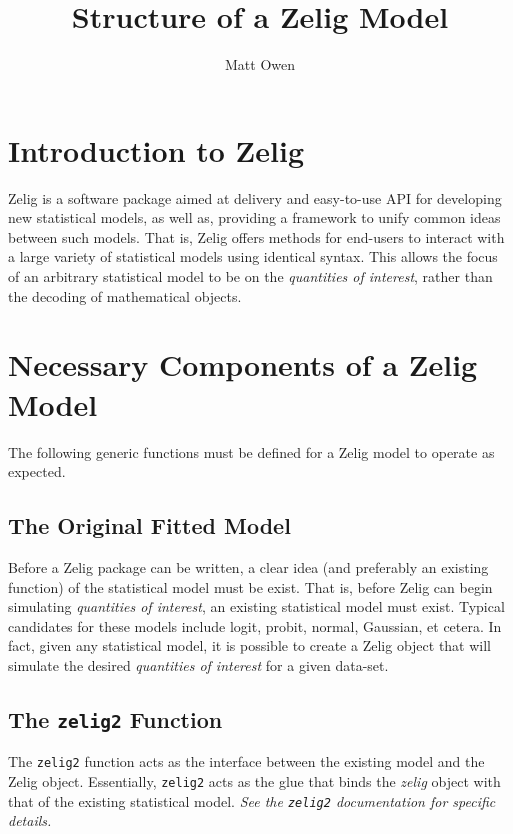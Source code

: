 \documentclass[a4paper,10pt]{article}
\begin{document}
%
\title{Structure of a Zelig Model}
\author{Matt Owen}
\maketitle


\section{Introduction to Zelig}
Zelig is a software package aimed at delivery and easy-to-use API for developing new statistical models, as well as, providing a framework to unify common ideas between such models.  That is, Zelig offers methods for end-users to interact with a large variety of statistical models using identical syntax.  This allows the focus of an arbitrary statistical model to be on the \emph{quantities of interest}, rather than the decoding of mathematical objects.



\section{Necessary Components of a Zelig Model}
The following generic functions must be defined for a Zelig model to operate as expected.

% 
\subsection{The Original Fitted Model}
Before a Zelig package can be written, a clear idea (and preferably an existing function) of the statistical model must be exist.  That is, before Zelig can begin simulating \emph{quantities of interest}, an existing statistical model must exist.  Typical candidates for these models include logit, probit, normal, Gaussian, et cetera.  In fact, given any statistical model, it is possible to create a Zelig object that will simulate the desired \emph{quantities of interest} for a given data-set.

\subsection{The {\tt zelig2} Function}
The {\tt zelig2} function acts as the interface between the existing model and the Zelig object.  Essentially, {\tt zelig2} acts as the glue that binds the \emph{zelig} object with that of the existing statistical model.  \emph{See the {\tt zelig2} documentation for specific details.}
\end{document}
